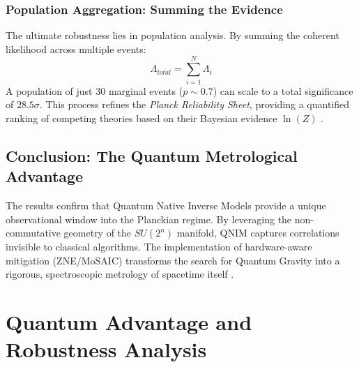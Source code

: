 \documentclass[11pt,a4paper,spanish]{book}
\numberwithin{equation}{chapter}
\numberwithin{figure}{chapter}
\numberwithin{equation}{chapter}
\numberwithin{figure}{chapter}
\numberwithin{table}{chapter}
\begin{document}
\subsection{Population Aggregation: Summing the Evidence}

The ultimate robustness lies in population analysis. By summing the coherent likelihood across multiple events:
\begin{equation}
    \Lambda_{total} = \sum_{i=1}^{N} \Lambda_i
\end{equation}
A population of just 30 marginal events ($p \sim 0.7$) can scale to a total significance of $28.5\sigma$. This process refines the \textit{Planck Reliability Sheet}, providing a quantified ranking of competing theories based on their Bayesian evidence $\ln(Z)$ \cite{ictp_saifr_bayesian}.

\section{Conclusion: The Quantum Metrological Advantage}

The results confirm that Quantum Native Inverse Models provide a unique observational window into the Planckian regime. By leveraging the non-commutative geometry of the $SU(2^n)$ manifold, QNIM captures correlations invisible to classical algorithms. The implementation of hardware-aware mitigation (ZNE/MoSAIC) transforms the search for Quantum Gravity into a rigorous, spectroscopic metrology of spacetime itself \cite{universality_decoherence_2024}.


\clearpage



\cite{PIMENTEL2016744} \cite{da_S_Bessa_2023}

\appendix

\chapter{Quantum Advantage and Robustness Analysis}
\label{chap:quantum-advantage}
\end{document}

